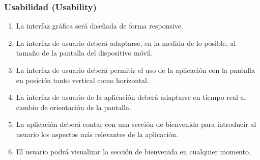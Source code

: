         \subsubsection{Usabilidad (Usability)}
            \begin{enumerate}[resume, label=\textbf{\texttt{RNF-\arabic*}}]
                \item \label{req:no_funcionales:ui_responsive} La interfaz gráfica será diseñada de forma \gls{responsive}.
                \item \label{req:no_funcionales:ui_tamanio_pantalla} La interfaz de usuario deberá adaptarse, en la medida de lo posible, al tamaño de la pantalla del dispositivo móvil.
                \item \label{req:no_funcionales:ui_orientacion_soporte} La interfaz de usuario deberá permitir el uso de la aplicación con la pantalla en posición tanto vertical como horizontal.
                \item \label{req:no_funcionales:ui_orientacion_dinamica} La interfaz de usuario de la aplicación deberá adaptarse en tiempo real al cambio de orientación de la pantalla.
                \item \label{req:no_funcionales:bienvenida} La aplicación deberá contar con una sección de bienvenida para introducir al usuario los aspectos más relevantes de la aplicación.
                \item \label{req:no_funcionales:bienvenida_demanda} El usuario podrá visualizar la sección de bienvenida en cualquier momento.
            \end{enumerate}
            
